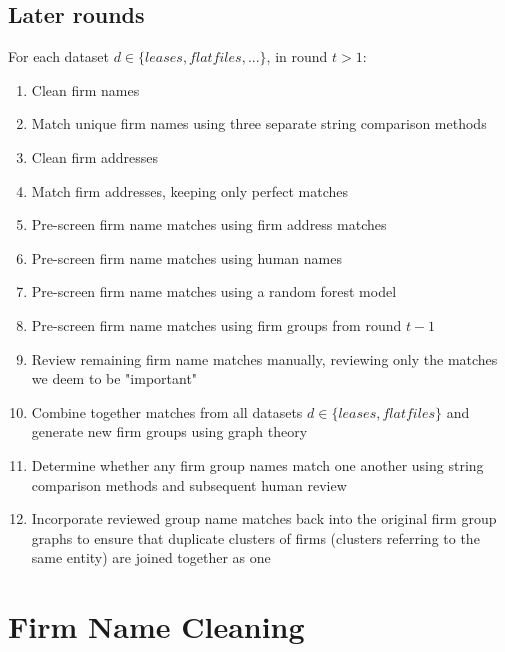 \documentclass{article}
\begin{document}
\subsection{Later rounds}
For each dataset $d \in \{leases, flatfiles, ... \}$, in round $t > 1$:
\begin{enumerate}
    \item Clean firm names 
    
    \item Match unique firm names using three separate string comparison methods
    
    \item Clean firm addresses 
    
    \item Match firm addresses, keeping only perfect matches

    \item Pre-screen firm name matches using firm address matches
    
    \item Pre-screen firm name matches using human names
    
    \item Pre-screen firm name matches using a random forest model
    
    \item Pre-screen firm name matches using firm groups from round $t - 1$
    
    \item Review remaining firm name matches manually, reviewing only the matches we deem to be "important"
    
    \item Combine together matches from all datasets $d \in \{leases, flatfiles\}$ and generate new firm groups using graph theory
    
    \item Determine whether any firm group names match one another using string comparison methods and subsequent human review
    
    \item Incorporate reviewed group name matches back into the original firm group graphs to ensure that duplicate clusters of firms (clusters referring to the same entity) are joined together as one
\end{enumerate}

\section{Firm Name Cleaning}
\end{document}

